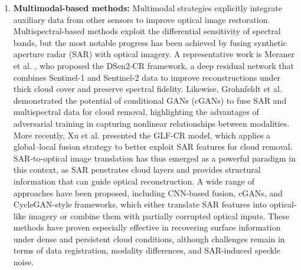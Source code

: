 \begin{enumerate}[label=(\Alph*)]
  \item \textbf{Multimodal-based methods:} Multimodal strategies explicitly integrate auxiliary data from other sensors to improve optical image restoration. Multispectral-based methods exploit the differential sensitivity of spectral bands, but the most notable progress has been achieved by fusing synthetic aperture radar (SAR) with optical imagery. A representative work is Meraner et al. \cite{CR_SEN2_dRNN}, who proposed the DSen2-CR framework, a deep residual network that combines Sentinel-1 and Sentinel-2 data to improve reconstructions under thick cloud cover and preserve spectral fidelity. Likewise, Grohnfeldt et al. \cite{A_cGAN_fuse_sar_MS_CR} demonstrated the potential of conditional GANs (cGANs) to fuse SAR and multispectral data for cloud removal, highlighting the advantages of adversarial training in capturing nonlinear relationships between modalities. More recently, Xu et al. \cite{GLF_CR} presented the GLF-CR model, which applies a global–local fusion strategy to better exploit SAR features for cloud removal. SAR-to-optical image translation has thus emerged as a powerful paradigm in this context, as SAR penetrates cloud layers and provides structural information that can guide optical reconstruction. A wide range of approaches have been proposed, including CNN-based fusion, cGANs, and CycleGAN-style frameworks, which either translate SAR features into optical-like imagery or combine them with partially corrupted optical inputs. These methods have proven especially effective in recovering surface information under dense and persistent cloud conditions, although challenges remain in terms of data registration, modality differences, and SAR-induced speckle noise.


\end{enumerate}
